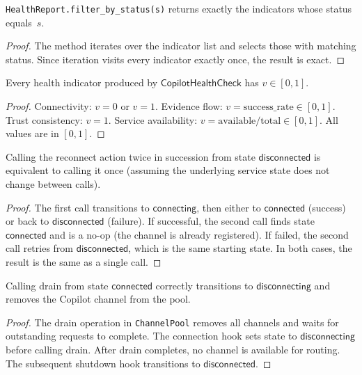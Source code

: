 \documentclass[11pt]{article}
\newcommand{\HealthChk}{\mathsf{CopilotHealthCheck}}
\begin{document}
\begin{lemma}\label{lem:healthfilter}
\texttt{HealthReport.filter\_by\_status(s)} returns exactly
the indicators whose status equals~$s$.
\end{lemma}
\begin{proof}
The method iterates over the indicator list and selects
those with matching status.  Since iteration visits every
indicator exactly once, the result is exact.
\end{proof}

\begin{lemma}\label{lem:healthvalbounds}
Every health indicator produced by $\HealthChk$ has
$v \in [0, 1]$.
\end{lemma}
\begin{proof}
Connectivity: $v = 0$ or $v = 1$.
Evidence flow: $v = \mathrm{success\_rate} \in [0,1]$.
Trust consistency: $v = 1$.
Service availability: $v = \text{available}/\text{total} \in [0,1]$.
All values are in $[0,1]$.
\end{proof}

\begin{lemma}%
\label{lem:reconnidem}
Calling the reconnect action twice in succession from state
$\mathsf{disconnected}$ is equivalent to calling it once
(assuming the underlying service state does not change
between calls).
\end{lemma}
\begin{proof}
The first call transitions to $\mathsf{connecting}$, then
either to $\mathsf{connected}$ (success) or back to
$\mathsf{disconnected}$ (failure).
If successful, the second call finds state $\mathsf{connected}$
and is a no-op (the channel is already registered).
If failed, the second call retries from $\mathsf{disconnected}$,
which is the same starting state.  In both cases, the
result is the same as a single call.
\end{proof}

\begin{lemma}%
\label{lem:drainsafe}
Calling drain from state $\mathsf{connected}$ correctly
transitions to $\mathsf{disconnecting}$ and removes the
Copilot channel from the pool.
\end{lemma}
\begin{proof}
The drain operation in \texttt{ChannelPool} removes all
channels and waits for outstanding requests to complete.
The connection hook sets state to $\mathsf{disconnecting}$
before calling drain.  After drain completes, no channel
is available for routing.  The subsequent shutdown hook
transitions to $\mathsf{disconnected}$.
\end{proof}
\end{document}
